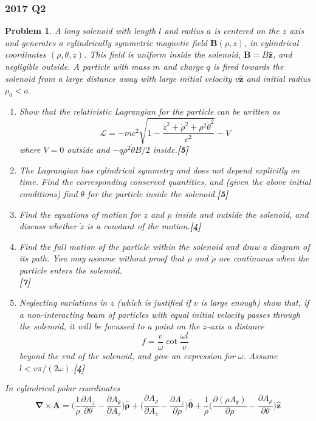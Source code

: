 \documentclass[a4paper]{article}
\theoremstyle{new}
\newtheorem{qns}{Problem}[section]
\begin{document}
\subsubsection*{2017 Q2}
\begin{qns}
A long solenoid with length $l$ and radius $a$ is centered on the $z$ axis and generates a cylindrically symmetric magnetic field $\mathbf{B}(\rho, z)$, in cylindrical coordinates $(\rho, \theta, z)$. This field is uniform inside the solenoid, $\mathbf{B}=B\mathbf{\hat{z}}$, and negligible outside. A particle with mass $m$ and charge $q$ is fired towards the solenoid from a large distance away with large initial velocity $v\mathbf{\hat{z}}$ and initial radius $\rho_0<a$.
\begin{enumerate}[label=(\alph*)]
\item Show that the relativistic Lagrangian for the particle can be written as
$$\mathcal{L}=-mc^2\sqrt{1-\frac{\dot{z}^2+\dot{\rho}^2+\rho^2\dot{\theta}^2}{c^2}}-V$$
where $V=0$ outside and $-q\rho^2\dot{\theta}B/2$ inside.\hfill\textbf{[5]}
\item The Lagrangian has cylindrical symmetry and does not depend explicitly on time. Find the corresponding conserved quantities, and (given the above initial conditions) find $\dot{\theta}$ for the particle inside the solenoid.\hfill\textbf{[5]}
\item Find the equations of motion for $z$ and $\rho$ inside and outside the solenoid, and discuss whether $\dot{z}$ is a constant of the motion.\hfill\textbf{[4]}
\item Find the full motion of the particle within the solenoid and draw a
diagram of its path. You may assume without proof that $\rho$ and $\dot{\rho}$ are continuous when the particle enters the solenoid.\\

\hfill\textbf{[7]}
\item Neglecting variations in $\dot{z}$ (which is justified if $v$ is large enough) show that, if a non-interacting beam of particles with equal initial velocity passes through the solenoid, it will be focussed to a point on the $z$-axis a distance
$$f=\frac{v}{\omega}\cot\frac{\omega l}{v}$$
beyond the end of the solenoid, and give an expression for $\omega$. Assume $l < v\pi/(2\omega)$.\hfill\textbf{[4]}
\end{enumerate}
In cylindrical polar coordinates
$$\boldsymbol{\nabla}\times\mathbf{A}=\bigg(\frac{1}{\rho}\frac{\partial A_z}{\partial\theta}-\frac{\partial A_\theta}{\partial A_z}\bigg)\boldsymbol{\hat{\rho}}+\bigg(\frac{\partial A_\rho}{\partial A_z}-\frac{\partial A_z}{\partial\rho}\bigg)\boldsymbol{\hat{\theta}}+\frac{1}{\rho}\bigg(\frac{\partial(\rho A_\theta)}{\partial\rho}-\frac{\partial A_\rho}{\partial\theta}\bigg)\mathbf{\hat{z}}$$
\end{qns}
\end{document}
